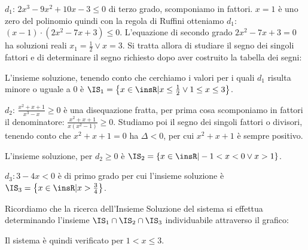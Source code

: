 \begin{itemize*}
\item $d_1$: $2x^3-9x^2+10x-3\le 0$ di terzo grado, scomponiamo in fattori. $x=1$ è uno zero del polinomio quindi con la regola di Ruffini otteniamo $d_1$: $(x-1)\cdot (2x^2-7x+3)\le 0$. L'equazione di secondo grado $2x^2-7x+3=0$ ha soluzioni reali $x_1=\frac 1 2\vee x=3$. Si tratta allora di studiare il segno dei singoli fattori e di determinare il segno richiesto dopo aver costruito la tabella dei segni:
\begin{center}
 
\end{center}
L'insieme soluzione, tenendo conto che cerchiamo i valori per i quali $d_1$ risulta minore o uguale a $0$ è $\IS_1=\left\{x\in \insR | x\le\frac 1 2\vee 1\le x\le 3\right\}$.

\item $d_2$: $\frac{x^2+x+1}{x^3-x}\ge 0$ è una disequazione fratta, per prima cosa scomponiamo in fattori il denominatore: $\frac{x^2+x+1}{x(x^2-1)}\ge 0$.
Studiamo poi il segno dei singoli fattori o divisori, tenendo conto che $x^2+x+1=0$ ha $\Delta <0$, per cui $x^2+x+1$ è sempre positivo.
\begin{center}
 
\end{center}
L'insieme soluzione, per $d_2\ge 0$ è $\IS_2=\left\{x\in \insR | -1<x<0\vee x>1\right\}$.
\item $d_3:3-4x<0$ è di primo grado per cui l'insieme soluzione è $\IS_3=\left\{x\in \insR | x>\frac 3 4\right\}$.
\end{itemize*}
Ricordiamo che la ricerca dell’Insieme Soluzione del sistema si effettua determinando l’insieme $\IS_1\cap \IS_2\cap \IS_3$ individuabile attraverso il grafico:
\begin{center}
 
\end{center}
Il sistema è quindi verificato per $1<x\le 3$.

\vspazio\ovalbox{\risolvii \ref{ese:4.75}, \ref{ese:4.76}, \ref{ese:4.77}, \ref{ese:4.78}, \ref{ese:4.79}, \ref{ese:4.80}, \ref{ese:4.81}, \ref{ese:4.82}, \ref{ese:4.83}}
\newpage

\cleardoublepage
